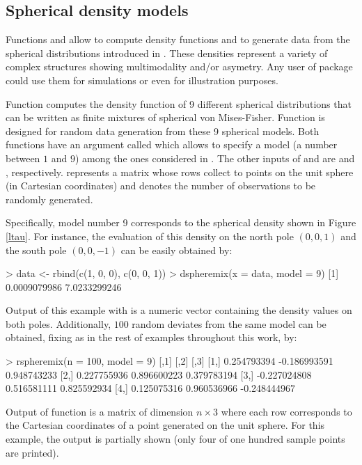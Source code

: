 \subsection{Spherical density models}

Functions  and  allow to compute density functions and to generate data from the spherical distributions introduced in \cite{saavedra2020nonparametric}. These densities represent a variety of complex structures showing multimodality and/or asymetry. Any user of package  could use them for simulations or even for illustration purposes.

Function  computes the density function of 9 different spherical distributions that can be written as finite mixtures of spherical von Mises-Fisher. Function  is designed for random data generation from these 9 spherical models. Both functions have an argument called  which allows to specify a model (a number between $1$ and $9$) among the ones considered in \cite{saavedra2020nonparametric}. The other inputs of  and  are  and , respectively.  represents a matrix whose rows collect to points on the unit sphere (in Cartesian coordinates) and  denotes the number of observations to be randomly generated. %

Specifically, model number 9 corresponds to the spherical density shown in Figure \ref{ltau}. For instance, the evaluation of this density on the north pole $(0,0,1)$ and the south pole $(0,0,-1)$ can be easily obtained by:  
\begin{example}
> data <- rbind(c(1, 0, 0), c(0, 0, 1))
> dspheremix(x = data, model = 9)
[1] 0.0009079986 7.0233299246
\end{example}
Output of this example with  is a numeric vector containing the  density values on both poles. Additionally, $100$ random deviates from the same model can be obtained, fixing  as in the rest of examples throughout this work, by: 
\begin{example}
> rspheremix(n = 100, model = 9)
            [,1]         [,2]         [,3]
  [1,]  0.254793394 -0.186993591  0.948743233
  [2,]  0.227755936  0.896600223  0.379783194
  [3,] -0.227024808  0.516581111  0.825592934
  [4,]  0.125075316  0.960536966 -0.248444967
\end{example}
Output of function  is a matrix of dimension $n\times 3$ where each row corresponds to the Cartesian coordinates of a point generated on the unit sphere. For this example, the output is partially shown (only four of one hundred sample points are printed). 





